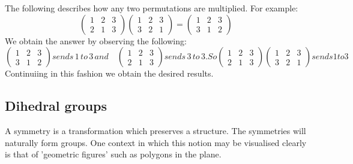 The following describes how any two permutations are multiplied. For example:
$$ \begin{pmatrix} 1 & 2 & 3 \\ 2 & 1 & 3 \end{pmatrix} \begin{pmatrix} 1 & 2 & 3 \\ 3 & 2 & 1 \end{pmatrix} = \begin{pmatrix} 1 & 2 & 3 \\ 3 & 1 & 2 \end{pmatrix} $$
We obtain the answer by observing the following:
$$
\begin{pmatrix} 1&2&3 \\ 3&1&2 \end{pmatrix} sends \,1 \, to \, 3 \, and \quad \begin{pmatrix} 1&2&3 \\ 2&1&3\end{pmatrix} sends \, 3 \, to \, 3. So \begin{pmatrix}1&2&3 \\ 2&1&3 \end{pmatrix} \begin{pmatrix}1&2&3 \\ 3&2&1\end{pmatrix} sends 1 to 3
$$
Continuiing in this fashion we obtain the desired results.

\subsection*{Dihedral groups}
A symmetry is a transformation which preserves a structure. The symmetries will naturally form groups. One context in which this notion may be visualised clearly is that of 'geometric figures' such as polygons in the plane.

